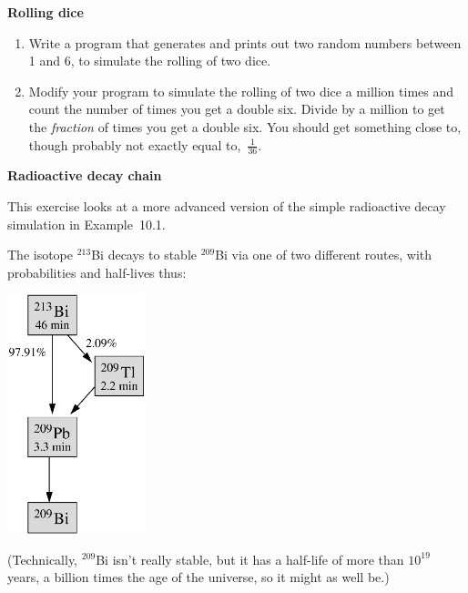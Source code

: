 \documentclass[12pt]{article}
\begin{document}
\par
\bigskip
{}\par
\noindent\hrulefill


\begin{exercises}


\exercise \textbf{Rolling dice}
\begin{enumerate}\setlength{\itemsep}{0pt}
\item Write a program that generates and prints out two random
  numbers between 1 and 6, to simulate the rolling of two dice.
\item Modify your program to simulate the rolling of two dice a million
  times and count the number of times you get a double six.  Divide by a
  million to get the \emph{fraction} of times you get a double six.  You
  should get something close to, though probably not exactly equal
  to,~$\frac{1}{36}$.
\end{enumerate}



\exercise \textbf{Radioactive decay chain}

\exskip This exercise looks at a more advanced version of the simple
radioactive decay simulation in Example~10.1.

The isotope $^{213}$Bi decays to stable $^{209}$Bi via one of two different
routes, with probabilities and half-lives thus:
\begin{center}
\includegraphics[width=4cm]{decaychain.eps}
\end{center}
(Technically, $^{209}$Bi isn't really stable, but it has a half-life of
more than $10^{19}$ years, a billion times the age of the universe, so it
might as well be.)


\end{exercises}
\end{document}
